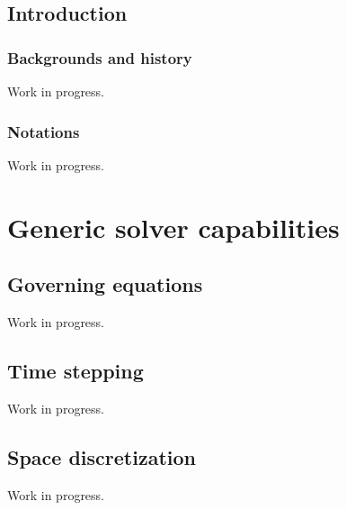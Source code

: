 \documentclass[a4paper,10pt,twoside]{csdoc}
\newcounter{prog}[part]
\begin{document}
\def\contentsname{\textbf{\normalsize Table of contents}\pdfbookmark[1]{Contents}{contents}}

\large
\makepdgCS
\normalsize

\passepage


\passepart
\begin{center}\begin{singlespace}
\tableofcontents
\end{singlespace}\end{center}


%
\passepage

\printnomenclature
%
\chapter{Introduction}

\section{Backgrounds and history}
Work in progress.
\section{Notations}
Work in progress.

\part{Generic solver capabilities}
\setcounter{chapter}{0}
\setcounter{section}{0}
\setcounter{equation}{0}
\setcounter{figure}{0}

\chapter{Governing equations}
Work in progress.


\chapter{Time stepping}
Work in progress.


\chapter{Space discretization}
Work in progress.

\end{document}
